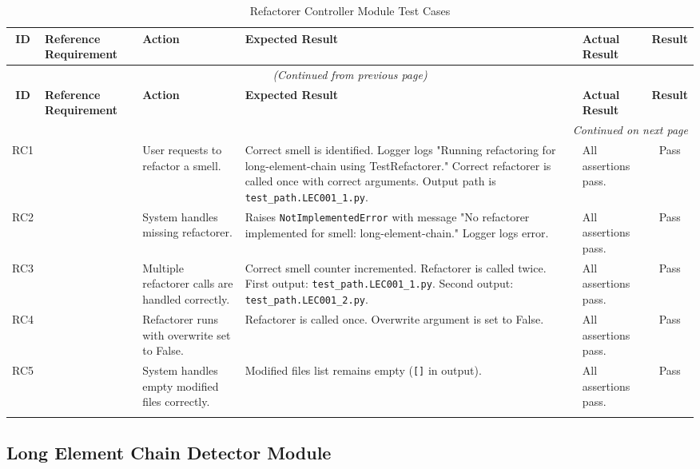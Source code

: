\documentclass[12pt, titlepage]{article}
\begin{document}
\begin{longtable}{|c|p{2.5cm}|p{2cm}|p{4cm}|p{4cm}|c|}
\hline
\textbf{ID} & \textbf{Reference Requirement} & \textbf{Action} & \textbf{Expected Result} & \textbf{Actual Result} & \textbf{Result} \\ \hline
\endfirsthead

\multicolumn{6}{c}{\textit{(Continued from previous page)}} \\ \hline
\textbf{ID} & \textbf{Reference Requirement} & \textbf{Action} & \textbf{Expected Result} & \textbf{Actual Result} & \textbf{Result} \\ \hline
\endhead

\hline \multicolumn{6}{|r|}{\textit{Continued on next page}} \\ \hline
\endfoot

\hline
\endlastfoot

RC1 & & User requests to refactor a smell. & Correct smell is identified. Logger logs "Running refactoring for long-element-chain using TestRefactorer." Correct refactorer is called once with correct arguments. Output path is \texttt{test\_path.LEC001\_1.py}. & All assertions pass. & \cellcolor{green!20} Pass \\ \hline
RC2 & & System handles missing refactorer. & Raises \texttt{NotImplementedError} with message "No refactorer implemented for smell: long-element-chain." Logger logs error. & All assertions pass. & \cellcolor{green!20} Pass \\ \hline
RC3 & & Multiple refactorer calls are handled correctly. & Correct smell counter incremented. Refactorer is called twice. First output: \texttt{test\_path.LEC001\_1.py}. Second output: \texttt{test\_path.LEC001\_2.py}. & All assertions pass. & \cellcolor{green!20} Pass \\ \hline
RC4 & & Refactorer runs with overwrite set to False. & Refactorer is called once. Overwrite argument is set to False. & All assertions pass. & \cellcolor{green!20} Pass \\ \hline
RC5 & & System handles empty modified files correctly. & Modified files list remains empty (\texttt{[]} in output). & All assertions pass. & \cellcolor{green!20} Pass \\ \hline

\caption{Refactorer Controller Module Test Cases}
\label{table:refactorer_controller_tests}
\end{longtable}


\subsection{Long Element Chain Detector Module}
\end{document}
